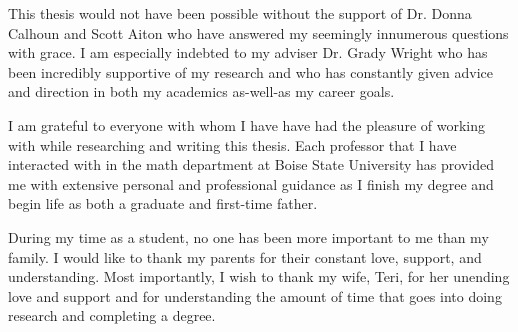 This thesis would not have been possible without the support of Dr. Donna Calhoun and Scott Aiton who have answered my seemingly innumerous questions with grace. I am especially indebted to my adviser Dr. Grady Wright who has been incredibly supportive of my research and who has constantly given advice and direction in both my academics as-well-as my career goals.

I am grateful to everyone with whom I have have had the pleasure of working with while researching and writing this thesis. Each professor that I have interacted with in the math department at Boise State University has provided me with extensive personal and professional guidance as I finish my degree and begin life as both a graduate and first-time father.

During my time as a student, no one has been more important to me than my family. I would like to thank my parents for their constant love, support, and understanding. Most importantly, I wish to thank my wife, Teri, for her unending love and support and for understanding the amount of time that goes into doing research and completing a degree.